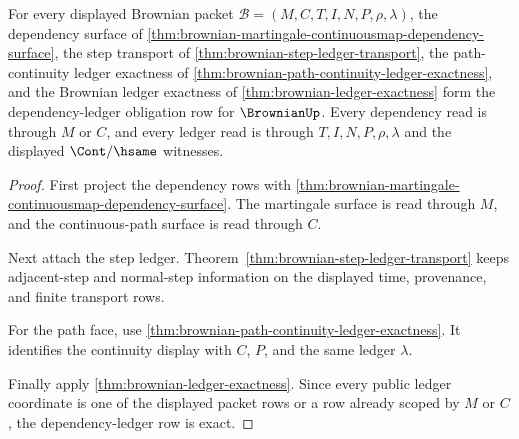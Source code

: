 \begin{theorem}
\label{thm:brownian-dependency-ledger-obligation-exactness}
For every displayed Brownian packet
$\mathcal{B}=(M,C,T,I,N,P,\rho,\lambda)$, the dependency surface of
\autoref{thm:brownian-martingale-continuousmap-dependency-surface}, the step
transport of \autoref{thm:brownian-step-ledger-transport}, the path-continuity
ledger exactness of \autoref{thm:brownian-path-continuity-ledger-exactness},
and the Brownian ledger exactness of \autoref{thm:brownian-ledger-exactness}
form the dependency-ledger obligation row for $\BrownianUp$. Every dependency
read is through $M$ or $C$, and every ledger read is through
$T,I,N,P,\rho,\lambda$ and the displayed $\Cont/\hsame$ witnesses.
\end{theorem}
\begin{proof}
First project the dependency rows with
\autoref{thm:brownian-martingale-continuousmap-dependency-surface}. The
martingale surface is read through $M$, and the continuous-path surface is read
through $C$.

Next attach the step ledger. Theorem~\ref{thm:brownian-step-ledger-transport}
keeps adjacent-step and normal-step information on the displayed time,
provenance, and finite transport rows.

For the path face, use
\autoref{thm:brownian-path-continuity-ledger-exactness}. It identifies the
continuity display with $C$, $P$, and the same ledger $\lambda$.

Finally apply \autoref{thm:brownian-ledger-exactness}. Since every public
ledger coordinate is one of the displayed packet rows or a row already scoped
by $M$ or $C$, the dependency-ledger row is exact.
\end{proof}

